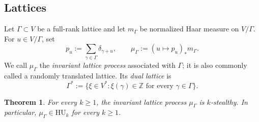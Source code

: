 \documentclass[11pt,reqno,a4paper]{amsart}
\numberwithin{equation}{section}
\theoremstyle{compact}
\newtheorem{theorem}{Theorem}[section]
\theoremstyle{definition}
\theoremstyle{definition}
\newcommand{\HU}{\mathrm{HU}}
\begin{document}
\subsection{Lattices}
\label{subsec:lattices}

Let $\Gamma\subset V$ be a full-rank lattice and let $m_\Gamma$ be normalized Haar
measure on $V/\Gamma$.  For $u\in V/\Gamma$, set
\begin{equation}\label{eq:lattice-configuration}
  p_u:=\sum_{\gamma\in\Gamma}\delta_{\gamma+u},
  \qquad
  \mu_\Gamma:=(u\mapsto p_u)_*m_\Gamma.
\end{equation}
We call $\mu_\Gamma$ the \emph{invariant lattice process} associated with $\Gamma$; it
is also commonly called a randomly translated lattice.  Its \emph{dual lattice}
is
\begin{equation}\label{eq:dual-lattice}
  \Gamma^*:=\{\xi\in V^*: \xi(\gamma)\in\mathbb Z
  \text{ for every }\gamma\in\Gamma\}.
\end{equation}

\begin{theorem}\label{thm:lattice-all-order-stealthy}
For every $k\geq1$, the invariant lattice process $\mu_\Gamma$ is $k$-stealthy.
In particular, $\mu_\Gamma\in\HU_k$ for every $k\geq1$.
\end{theorem}
\end{document}
